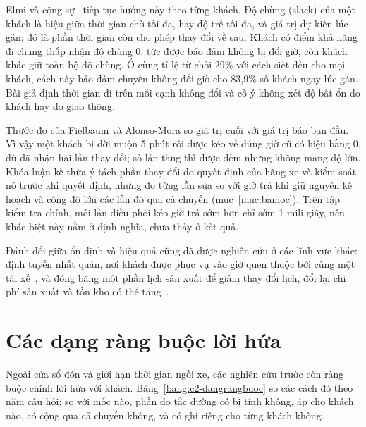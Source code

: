 Elmi và cộng sự~\cite{elmi2026} tiếp tục hướng này theo từng khách. Độ chùng (slack) của một khách là hiệu giữa thời
gian chờ tối đa, hay độ trễ tối đa, và giá trị dự kiến lúc gán; đó là phần thời gian còn cho phép thay đổi về sau.
Khách có điểm khả năng đi chung thấp nhận độ chùng 0, tức được bảo đảm không bị đổi giờ, còn khách khác giữ toàn bộ độ
chùng. Ở cùng tỉ lệ từ chối 29\% với cách siết đều cho mọi khách, cách này bảo đảm chuyến không đổi giờ cho 83,9\% số
khách ngay lúc gán. Bài giả định thời gian đi trên mỗi cạnh không đổi và cố ý không xét độ bất ổn do khách hay do giao
thông.

Thước đo của Fielbaum và Alonso-Mora so giá trị cuối với giá trị báo ban đầu. Vì vậy một khách bị dời muộn 5 phút rồi
được kéo về đúng giờ cũ có hiệu bằng 0, dù đã nhận hai lần thay đổi; số lần tăng thì được đếm nhưng không mang độ
lớn. Khóa luận kế thừa ý tách phần thay đổi do quyết định của hãng xe và kiểm soát nó trước khi quyết định, nhưng đo
từng lần sửa so với giờ trả khi giữ nguyên kế hoạch và cộng độ lớn các lần đó qua cả chuyến (mục~\ref{muc:bamoc}).
Trên tập kiểm tra chính, mỗi lần điều phối kéo giờ trả sớm hơn chỉ sớm 1 mili giây, nên khác biệt này nằm ở định
nghĩa, chưa thấy ở kết quả.

Đánh đổi giữa ổn định và hiệu quả cũng đã được nghiên cứu ở các lĩnh vực khác: định tuyến nhất quán, nơi khách được
phục vụ vào giờ quen thuộc bởi cùng một tài xế~\cite{kovacs2014}, và đóng băng một phần lịch sản xuất để giảm thay
đổi lịch, đổi lại chi phí sản xuất và tồn kho có thể tăng~\cite{sridharan1987}.

\section{Các dạng ràng buộc lời hứa}
\label{muc:c2-rangbuoc}

Ngoài cửa sổ đón và giới hạn thời gian ngồi xe, các nghiên cứu trước còn ràng buộc chính lời hứa với khách.
Bảng~\ref{bang:c2-dangrangbuoc} so các cách đó theo năm câu hỏi: so với mốc nào, phần do tắc đường có bị tính không,
áp cho khách nào, có cộng qua cả chuyến không, và có ghi riêng cho từng khách không.

